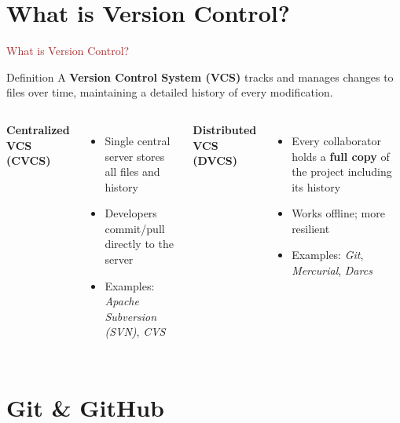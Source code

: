 \section{What is Version Control?}

\begin{frame}{\textcolor{brown}{What is Version Control?}}
  \begin{block}{Definition}
    A \textbf{Version Control System (VCS)} tracks and manages changes to files over time, maintaining a detailed history of every modification.
  \end{block}

  \vspace{0.5em}
  \begin{columns}[T]
      \textbf{\faServer\; Centralized VCS (CVCS)}
      \begin{itemize}
        \item Single central server stores all files and history
        \item Developers commit/pull directly to the server
        \item Examples: \textit{Apache Subversion (SVN)}, \textit{CVS}
      \end{itemize}

      \textbf{\faNetworkWired\; Distributed VCS (DVCS)}
      \begin{itemize}
        \item Every collaborator holds a \textbf{full copy} of the project including its history
        \item Works offline; more resilient
        \item Examples: \textit{Git}, \textit{Mercurial}, \textit{Darcs}
      \end{itemize}
  \end{columns}
\end{frame}

\section{Git \& GitHub}

